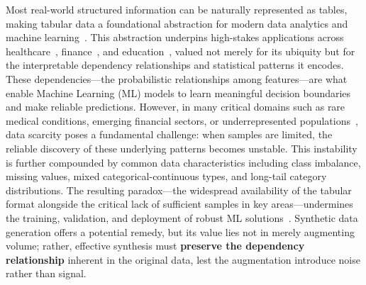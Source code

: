 Most real-world structured information can be naturally represented as tables, making tabular data a foundational abstraction for modern data analytics and machine learning~\cite{jonker2025structured_unstructured_ibm}. This abstraction underpins high-stakes applications across healthcare~\cite{choi2017generating}, finance~\cite{rundo2019machine}, and education~\cite{luan2021review}, valued not merely for its ubiquity but for the interpretable dependency relationships and statistical patterns it encodes.
These dependencies---the probabilistic relationships among features---are what enable Machine Learning (ML) models to learn meaningful decision boundaries and make reliable predictions.
However, in many critical domains such as rare medical conditions, emerging financial sectors, or underrepresented populations~\cite{fonseca2023tabular}, data scarcity poses a fundamental challenge: when samples are limited, the reliable discovery of these underlying patterns becomes unstable.
This instability is further compounded by common data characteristics including class imbalance, missing values, mixed categorical-continuous types, and long-tail category distributions.
The resulting paradox---the widespread availability of the tabular format alongside the critical lack of sufficient samples in key areas---undermines the training, validation, and deployment of robust ML solutions~\cite{chai2022data, borisov2022deep}.
Synthetic data generation offers a potential remedy, but its value lies not in merely augmenting volume; rather, effective synthesis must \textbf{preserve the dependency relationship} inherent in the original data, lest the augmentation introduce noise rather than signal.

